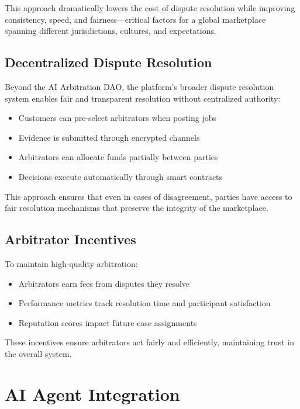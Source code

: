 \documentclass{article}
\begin{document}
This approach dramatically lowers the cost of dispute resolution while improving consistency, speed, and fairness—critical factors for a global marketplace spanning different jurisdictions, cultures, and expectations.

\subsection{Decentralized Dispute Resolution}

Beyond the AI Arbitration DAO, the platform's broader dispute resolution system enables fair and transparent resolution without centralized authority:

\begin{itemize}
    \item Customers can pre-select arbitrators when posting jobs
    \item Evidence is submitted through encrypted channels
    \item Arbitrators can allocate funds partially between parties
    \item Decisions execute automatically through smart contracts
\end{itemize}

This approach ensures that even in cases of disagreement, parties have access to fair resolution mechanisms that preserve the integrity of the marketplace.

\subsection{Arbitrator Incentives}

To maintain high-quality arbitration:

\begin{itemize}
    \item Arbitrators earn fees from disputes they resolve
    \item Performance metrics track resolution time and participant satisfaction
    \item Reputation scores impact future case assignments
\end{itemize}

These incentives ensure arbitrators act fairly and efficiently, maintaining trust in the overall system.

\section{AI Agent Integration}
\end{document}
